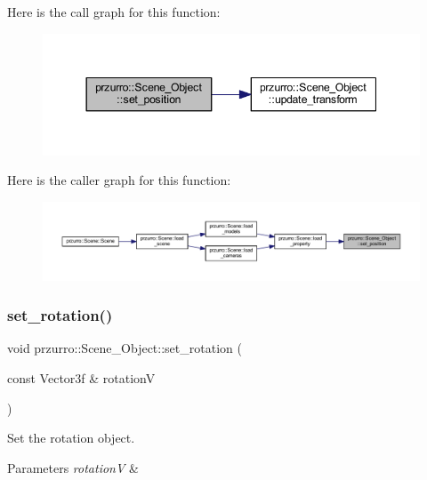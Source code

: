 Here is the call graph for this function\+:
\nopagebreak
\begin{figure}[H]
\begin{center}
\leavevmode
\includegraphics[width=344pt]{d9/d84/classprzurro_1_1_scene___object_adfb1f8a52324f4618474a89da64b65d6_cgraph}
\end{center}
\end{figure}
Here is the caller graph for this function\+:
\nopagebreak
\begin{figure}[H]
\begin{center}
\leavevmode
\includegraphics[width=350pt]{d9/d84/classprzurro_1_1_scene___object_adfb1f8a52324f4618474a89da64b65d6_icgraph}
\end{center}
\end{figure}
\mbox{\label{classprzurro_1_1_scene___object_afda0a69deccf91508a1781418d2c3497}} 
\subsubsection{\texorpdfstring{set\_rotation()}{set\_rotation()}}
{\footnotesize\ttfamily void przurro\+::\+Scene\+\_\+\+Object\+::set\+\_\+rotation (\begin{DoxyParamCaption}\item[{const Vector3f \&}]{rotationV }\end{DoxyParamCaption})}



Set the rotation object. 


\begin{DoxyParams}{Parameters}
{\em rotationV} & \\
\hline
\end{DoxyParams}


